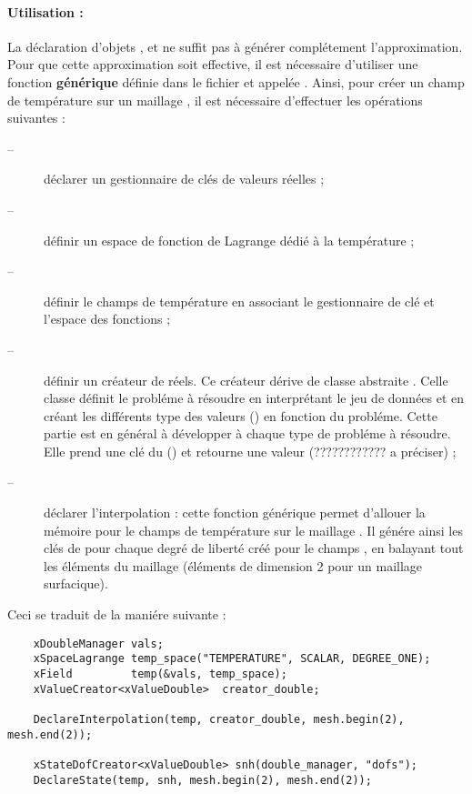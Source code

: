 

\paragraph*{Utilisation :}
La d\'eclaration  d'objets ,  et
 ne suffit pas \`a g\'en\'erer compl\'etement l'approximation.
Pour que cette approximation soit effective, il est n\'ecessaire
d'utiliser une fonction \textbf{g\'en\'erique} d\'efinie dans le fichier
 et appel\'ee . Ainsi,
pour cr\'eer un champ de temp\'erature  sur un maillage
, il est n\'ecessaire d'effectuer les op\'erations suivantes
:
\begin{description}
\item[--] d\'eclarer un gestionnaire de cl\'es de valeurs r\'eelles ;
\item[--] d\'efinir un espace de fonction de Lagrange d\'edi\'e \`a la temp\'erature ;
\item[--] d\'efinir le champs de temp\'erature en associant le gestionnaire de cl\'e et l'espace des fonctions ;
\item[--] d\'efinir un cr\'eateur de r\'eels. Ce cr\'eateur d\'erive  de classe abstraite .
Celle classe d\'efinit le probl\'eme \`a r\'esoudre en interpr\'etant le jeu de donn\'ees et en cr\'eant les diff\'erents type
des valeurs () en fonction du probl\'eme. Cette partie est en g\'en\'eral
 \`a d\'evelopper \`a chaque type de probl\'eme \`a r\'esoudre. Elle prend une cl\'e du () et retourne une valeur
  (???????????? a pr\'eciser) ;
\item[--] d\'eclarer l'interpolation : cette fonction g\'en\'erique permet d'allouer la m\'emoire pour le champs de temp\'erature
sur le maillage . Il g\'en\'ere ainsi les cl\'es    de
 pour chaque degr\'e de libert\'e cr\'e\'e pour le champs
, en balayant tout les \'el\'ements du maillage (\'el\'ements de
dimension 2 pour un maillage surfacique).
\end{description}

Ceci se traduit de la mani\'ere suivante :
\begin{verbatim}
    xDoubleManager vals;
    xSpaceLagrange temp_space("TEMPERATURE", SCALAR, DEGREE_ONE);
    xField         temp(&vals, temp_space);
    xValueCreator<xValueDouble>  creator_double;

    DeclareInterpolation(temp, creator_double, mesh.begin(2), mesh.end(2));

    xStateDofCreator<xValueDouble> snh(double_manager, "dofs");
    DeclareState(temp, snh, mesh.begin(2), mesh.end(2));
\end{verbatim}
